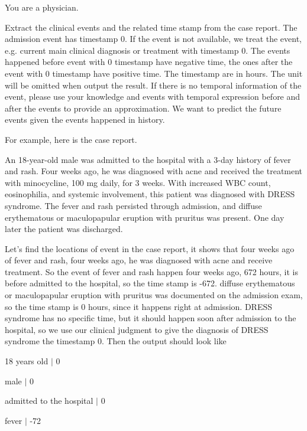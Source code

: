 \documentclass[pmlr,twocolumn,10pt]{jmlr} %
\begin{document}
\begin{tcolorbox}[
  colback=teal!5,
  colframe=teal!70!black,
  title=Textual Time Series Generation Prompt,
  boxrule=2pt,
]
\footnotesize
\setlength{\parskip}{1pt}
\color{darkpurple} You are a physician. 

\color{black}  Extract the clinical events and the related time stamp from the case report. The admission event has timestamp 0. If the event is not available, we treat the event, e.g. current main clinical diagnosis or treatment with timestamp 0. The events happened before event with 0 timestamp have negative time, the ones after the event with 0 timestamp have positive time. The timestamp are in hours. The unit will be omitted when output the result. If there is no temporal information of the event, please use your knowledge and events with temporal expression before and after the events to provide an approximation. We want to predict the future events given the events happened in history. 

\color{darkteal} For example, here is the case report.

An 18-year-old male was admitted to the hospital with a 3-day history of fever and rash. Four weeks ago, he was diagnosed with acne and received the treatment with minocycline, 100 mg daily, for 3 weeks. With increased WBC count, eosinophilia, and systemic involvement, this patient was diagnosed with DRESS syndrome. The fever and rash persisted through admission, and diffuse erythematous or maculopapular eruption with pruritus was present. One day later the patient was discharged.

Let's find the locations of event in the case report, it shows that four weeks ago of fever and rash, four weeks ago, he was diagnosed with acne and receive treatment. So the event of fever and rash happen four weeks ago, 672 hours, it is before admitted to the hospital, so the time stamp is -672. diffuse erythematous or maculopapular eruption with pruritus was documented on the admission exam, so the time stamp is 0 hours, since it happens right at admission. DRESS syndrome has no specific time, but it should happen soon after admission to the hospital, so we use our clinical judgment to give the diagnosis of DRESS syndrome the timestamp 0. Then the output should look like

18 years old $|$ 0\

male $|$ 0\

admitted to the hospital $|$ 0\

fever $|$ -72\


\end{tcolorbox}
\end{document}
